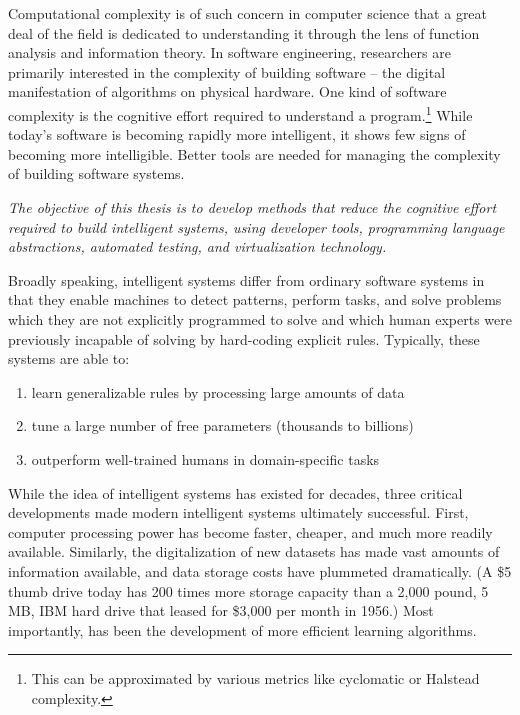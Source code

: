 \documentclass[12pt,initial,twoside,maitrise]{dms}
\numberwithin{equation}{section}
\numberwithin{table}{chapter}
\numberwithin{figure}{chapter}
\begin{document}
Computational complexity is of such concern in computer science that a great deal of the field is dedicated to understanding it through the lens of function analysis and information theory. In software engineering, researchers are primarily interested in the complexity of building software -- the digital manifestation of algorithms on physical hardware. One kind of software complexity is the cognitive effort required to understand a program.\footnote{This can be approximated by various metrics like cyclomatic or Halstead complexity.} While today's software is becoming rapidly more intelligent, it shows few signs of becoming more intelligible. Better tools are needed for managing the complexity of building software systems.

\textit{The objective of this thesis is to develop methods that reduce the cognitive effort required to build intelligent systems, using developer tools, programming language abstractions, automated testing, and virtualization technology.}

Broadly speaking, intelligent systems differ from ordinary software systems in that they enable machines to detect patterns, perform tasks, and solve problems which they are not explicitly programmed to solve and which human experts were previously incapable of solving by hard-coding explicit rules. Typically, these systems are able to:\\
%
\begin{enumerate}
    \item learn generalizable rules by processing large amounts of data
    \item tune a large number of free parameters (thousands to billions)
    \item outperform well-trained humans in domain-specific tasks
\end{enumerate}
%
While the idea of intelligent systems has existed for decades, three critical developments made modern intelligent systems ultimately successful. First, computer processing power has become faster, cheaper, and much more readily available. Similarly, the digitalization of new datasets has made vast amounts of information available, and data storage costs have plummeted dramatically. (A \$5 thumb drive today has 200 times more storage capacity than a 2,000 pound, 5 MB, IBM hard drive that leased for \$3,000 per month in 1956.) Most importantly, has been the development of more efficient learning algorithms.
\end{document}
